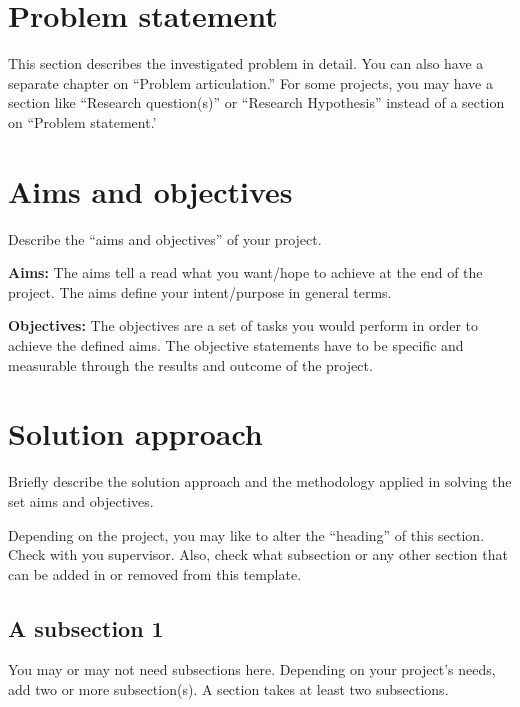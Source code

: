 \section{Problem statement}
\label{sec:intro_prob_art}
This section describes the investigated problem in detail. You can also have a separate chapter on ``Problem articulation.''  For some projects, you may have a section like ``Research question(s)'' or ``Research Hypothesis'' instead of a section on ``Problem statement.'

\section{Aims and objectives}
\label{sec:intro_aims_obj}
Describe the ``aims and objectives'' of your project. 

\textbf{Aims:} The aims tell a read what you want/hope to achieve at the end of the project. The  aims define your intent/purpose in general terms.  

\textbf{Objectives:} The objectives are a set of tasks you would perform in order to achieve the defined aims. The objective statements have to be specific and measurable through the results and outcome of the project.



\section{Solution approach}
\label{sec:intro_sol} %
Briefly describe the solution approach and the methodology applied in solving the set aims and objectives.

Depending on the project, you may like to alter the ``heading'' of this section. Check with you supervisor. Also, check what subsection or any other section that can be added in or removed from this template.

\subsection{A subsection 1}
\label{sec:intro_some_sub1}
You may or may not need subsections here. Depending on your project's needs, add two or more subsection(s). A section takes at least two subsections. 

